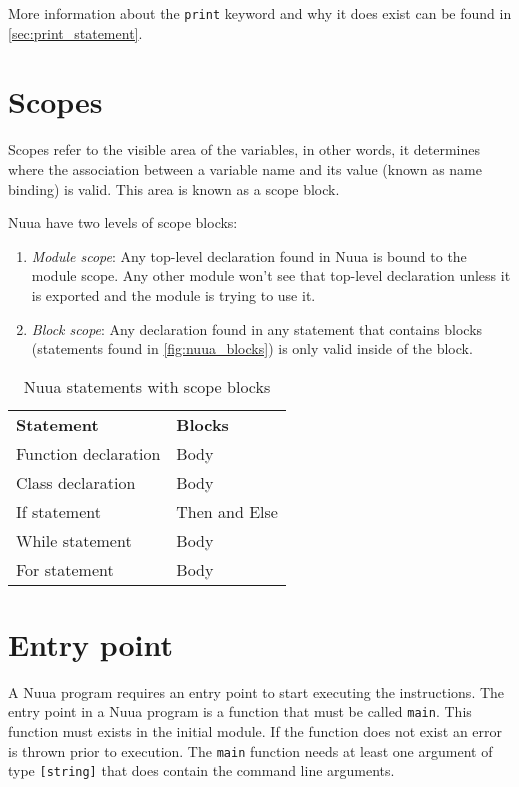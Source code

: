 More information about the \texttt{print} keyword and why it does exist can be found in \autoref{sec:print_statement}.

\section{Scopes}
\label{sec:nuua_scopes}

Scopes refer to the visible area of the variables, in other words, it determines where the association between a variable name
and its value (known as name binding) is valid. This area is known as a scope block.

Nuua have two levels of scope blocks:

\begin{enumerate}
    \item \emph{Module scope}: Any top-level declaration found in Nuua is bound to the module scope. Any other module won't see that
        top-level declaration unless it is exported and the module is trying to use it.
    \item \emph{Block scope}: Any declaration found in any statement that contains blocks (statements found in \autoref{fig:nuua_blocks})
        is only valid inside of the block.
\end{enumerate}

\begin{table}[H]
    \centering
    \begin{tabular}{ l l }
        \textbf{Statement} & \textbf{Blocks} \\
        Function declaration & Body \\
        Class declaration & Body \\
        If statement & Then and Else \\
        While statement & Body \\
        For statement & Body \\
    \end{tabular}
    \caption{Nuua statements with scope blocks}
    \label{fig:nuua_blocks}
\end{table}

\section{Entry point}

A Nuua program requires an entry point to start executing the instructions. The entry point in a Nuua program is a
function that must be called \texttt{main}. This function must exists in the initial module. If the function does not
exist an error is thrown prior to execution. The \texttt{main} function needs at least one argument of type \texttt{[string]}
that does contain the command line arguments.

